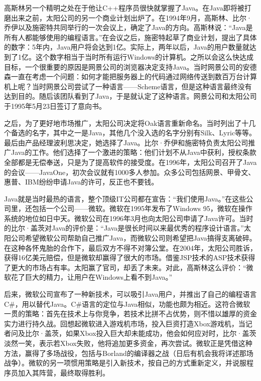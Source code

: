 \documentclass[
  letterpaper,
  DIV=11,
  numbers=noendperiod]{scrreprt}
\begin{document}
高斯林另一个精明之处在于他让C++程序员很快就掌握了Java。在Java即将被打磨出来之前，太阳公司的另一个商业计划出炉了。在1994年9月，高斯林、比尔·乔伊以及施密特共同举行的一次会议上，确定了Java的方向。高斯林说：``Java是所有人都能够使用的编程语言。''在会议之后，施密特起草了商业计划，提出了具体的数字：5年内，Java用户将会达到1亿。实际上，两年以后，Java的用户数量就达到了1亿。这个数字相当于当时所有运行Windows的计算机。之所以会这么快达成目标，一个很重要的原因是网景公司的浏览器决定支持Java。当时网景公司的安德森一直在考虑一个问题：如何才能把服务器上的代码通过网络传送到数百万台计算机上呢？当时网景公司尝试了一种语言------Scheme语言，但是这种语言最终没有达到目的。随后该团队看到了Java，于是就认定了这种语言。网景公司和太阳公司于1995年5月23日签订了意向书。

之后，为了更好地市场推广，太阳公司决定将Oak语言重新命名。当时列出了十几个备选的名字，其中之一是Java，其他几个没入选的名字分别有Silk、Lyric等等。最后由产品经理波利思决定，她选择了Java。比尔·乔伊和施密特负责太阳公司推广Java的工作。他们选择了一个激进的策略：他们计划不从Java中获利，授权条款全部都是无偿奉送，只是为了提高软件的接受度。在1996年，太阳公司召开了Java的会议------JavaOne，初次会议就有1000多人参加。众多公司包括网景、甲骨文、惠普、IBM纷纷申请Java的许可，反正也不要钱。

Java就是当时最热的语言，整个顶级IT公司都在宣告：``我们使用Java。''在这些公司里，还包括一个公司------微软。微软在1995年发布了Windows
95，微软在操作系统的地位如日中天。微软公司在1996年3月也向太阳公司申请了Java许可。当时的比尔·盖茨对Java的评价是：``Java是很长时间以来最优秀的程序设计语言。''太阳公司希望微软公司帮助自己推广Java，而微软公司则希望把Java搞得支离破碎。在这种各怀鬼胎的合作下，最后双方不得不对簿公堂。在2004年，太阳公司胜诉，获得16亿美元赔偿，但是微软却赢得了很大的市场。借鉴JSP技术的ASP技术获得了更大的市场占有率。太阳赢了官司，却丢了未来。对此，高斯林这么评价：``微软花了巨大的精力，让用户在Windows上看不到Java。''

后来，微软公司宣布了一种新技术，可以吸引Java用户，并推出了自己的编程语言C\#，用以替代Java。C\#语言的定位与Java相似，功能也颇为相近。这符合微软一贯的策略：首先在技术上与你竞争，若技术比拼不占优势，则不惜以雄厚的资金实力进行持久战。回想起微软进入游戏机市场，投入巨资打造Xbox游戏机，当记者问及比尔·盖茨，如果Xbox投入巨大却未能成功，他会如何应对时，比尔·盖茨淡然一笑，表示若Xbox失败，他将追加更多资金，再次尝试。微软正是凭借这种方法，赢得了多场战役，包括与Borland的编译器之战（日后有机会我将详述那场战争）。微软的另一项惯用策略是引入新技术，按自己的方式重新定义，并说服程序员加入其阵营，最终取得胜利。
\end{document}
